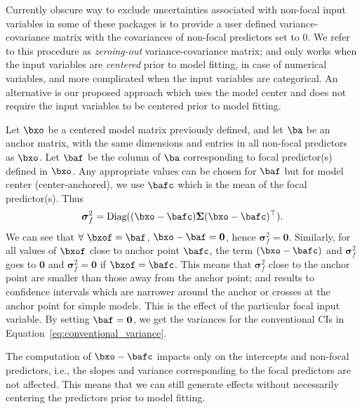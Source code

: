   Currently obscure way to exclude uncertainties associated with non-focal input variables in some of these packages is to provide a user defined variance-covariance matrix with the covariances of non-focal predictors set to $0$. We refer to this procedure as \emph{zeroing-out} variance-covariance matrix; and only works when the input variables are \emph{centered} prior to model fitting, in case of numerical variables, and more complicated when the input variables are categorical. An alternative is our proposed approach which uses the model center and does not require the input variables to be centered prior to model fitting.

Let $\bxo$ be a centered model matrix previously defined, and let $\ba$ be an anchor matrix, with the same dimensions and entries in all non-focal predictors as $\bxo$. Let $\baf$ be the column of $\ba$ corresponding to focal predictor(s) defined in $\bxo$. Any appropriate values can be chosen for $\baf$ but for model center (center-anchored), we use $\bafc$ which is the mean of the focal predictor(s). Thus 
%
\begin{align}\label{eq:centered_variance}
\boldsymbol\sigma_f^2 = \textrm{Diag}((\bxo - \bafc) \boldsymbol{\Sigma} (\bxo - \bafc)^\top).
\end{align}
%
We can see that $\forall ~\bxof=\baf$, $\bxo - \baf = \boldsymbol 0$, hence $\boldsymbol\sigma_f^2 = \boldsymbol{0}$. Similarly, for all values of $\bxof$ close to anchor point $\bafc$, the term $(\bxo - \bafc)$ and $\boldsymbol\sigma_f^2$ goes to $\boldsymbol 0$ and $\boldsymbol\sigma_f^2 = \boldsymbol 0$ if $\bxof=\bafc$. This means that $\boldsymbol\sigma_f^2$ close to the anchor point are smaller than those away from the anchor point; and results to confidence intervals which are narrower around the anchor or crosses at the anchor point for simple models. This is the effect of the particular focal input variable. By setting $\baf = \boldsymbol 0$, we get the variances for the conventional CIs in Equation~\ref{eq:conventional_variance}.


The computation of $\bxo - \bafc$ impacts only on the intercepts and non-focal predictors, i.e., the slopes and variance corresponding to the focal predictors are not affected. This means that we can still generate effects without necessarily centering the predictors prior to model fitting.

